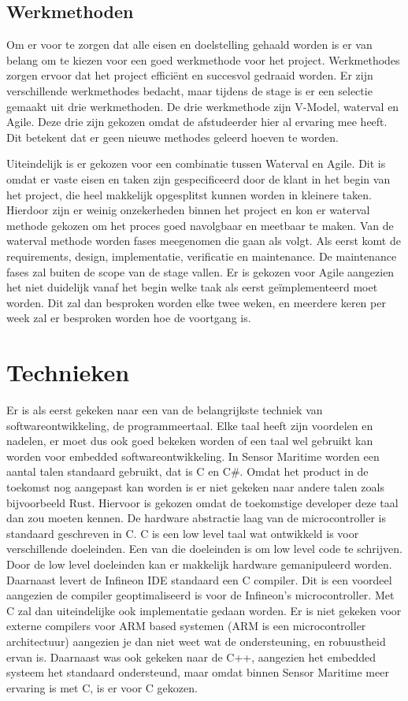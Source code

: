 \subsection{Werkmethoden}
Om er voor te zorgen dat alle eisen en doelstelling gehaald worden is er van belang om te kiezen voor een goed werkmethode voor het project. Werkmethodes zorgen ervoor dat het project efficiënt en succesvol gedraaid worden. Er zijn verschillende werkmethodes bedacht, maar tijdens de stage is er een selectie gemaakt uit drie werkmethoden. De drie werkmethode zijn V-Model, waterval en Agile. Deze drie zijn gekozen omdat de afstudeerder hier al ervaring mee heeft. Dit betekent dat er geen nieuwe methodes geleerd hoeven te worden. \newline

\noindent Uiteindelijk is er gekozen voor een combinatie tussen Waterval en Agile. Dit is omdat er vaste eisen en taken zijn gespecificeerd door de klant in het begin van het project, die heel makkelijk opgesplitst kunnen worden in kleinere taken. Hierdoor zijn er weinig onzekerheden binnen het project en kon er waterval methode gekozen om het proces goed navolgbaar en meetbaar te maken. Van de waterval methode worden fases meegenomen die gaan als volgt. Als eerst komt de requirements, design, implementatie, verificatie en maintenance. De maintenance fases zal buiten de scope van de stage vallen. Er is gekozen voor Agile aangezien het niet duidelijk vanaf het begin welke taak als eerst geïmplementeerd moet worden. Dit zal dan besproken worden elke twee weken, en meerdere keren per week zal er besproken worden hoe de voortgang is.




\section{Technieken}
Er is als eerst gekeken naar een van de belangrijkste techniek van softwareontwikkeling, de programmeertaal. Elke taal heeft zijn voordelen en nadelen, er moet dus ook goed bekeken worden of een taal wel gebruikt kan worden voor embedded softwareontwikkeling. In Sensor Maritime worden een aantal talen standaard gebruikt, dat is C en C\#. Omdat het product in de toekomst nog aangepast kan worden is er niet gekeken naar andere talen zoals bijvoorbeeld Rust. Hiervoor is gekozen omdat de toekomstige developer deze taal dan zou moeten kennen. De hardware abstractie laag van de microcontroller is standaard geschreven in C. C is een low level taal wat ontwikkeld is voor verschillende doeleinden. Een van die doeleinden is om low level code te schrijven. Door de low level doeleinden kan er makkelijk hardware gemanipuleerd worden. Daarnaast levert de Infineon IDE standaard een C compiler. Dit is een voordeel aangezien de compiler geoptimaliseerd is voor de Infineon's microcontroller. Met C zal dan uiteindelijke ook implementatie gedaan worden. Er is niet gekeken voor externe compilers voor ARM based systemen (ARM is een microcontroller architectuur) aangezien je dan niet weet wat de ondersteuning, en robuustheid ervan is. Daarnaast was ook gekeken naar de C++, aangezien het embedded systeem het standaard ondersteund, maar omdat binnen Sensor Maritime meer ervaring is met C, is er voor C gekozen. 

